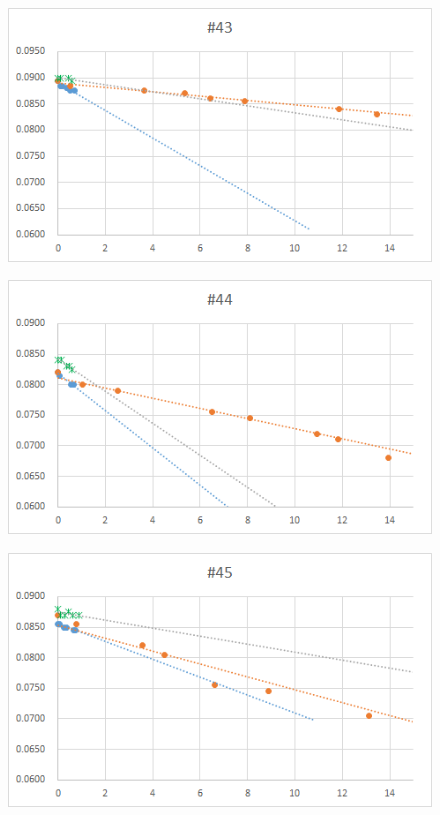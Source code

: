 \documentclass[12pt,a4paper]{jarticle}
\begin{document}
\begin{figure}[htbp]
  \centering
     \includegraphics[width=120mm]{vol_043.png}
\end{figure}
\begin{figure}[htbp]
  \centering
     \includegraphics[width=120mm]{vol_044.png}
\end{figure}
\begin{figure}[htbp]
  \centering
     \includegraphics[width=120mm]{vol_045.png}
\end{figure}
\end{document}
